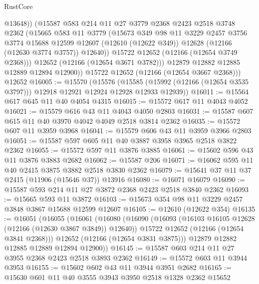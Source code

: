 \begin{lexlean}{RustCore}
\begin{coremodule}
                @13648))
            (@15587
              @583
              @214
              @11
              @27
              @3779
              @2368
              @2423
              @2518
              @3748
              @2362
              (@15665
                @583
                @11
                @3779
                (@15673
                  @349
                  @98
                  @11
                  @3229
                  @2457
                  @3756
                  @3774
                  @15688
                  @12599
                  @12607
                  (@12610 (@12622 @349))
                  @12628
                  (@12166 (@12630 @3774 @3757))
                  @12640))
              @15722
              @12652
              (@12166 (@12654 @3749 @2368)))
            @12652
            (@12166 (@12654 @3671 @3782)))
          @12879
          @12882
          @12885
          @12889
          @12894
          @12900))
      @15722
      @12652
      (@12166 (@12654 @3667 @2368)))
    @12652
@16005 := @15570
    (@15576
      (@15585 (@15992 (@12166 (@12654 @3535 @3797))) @12918 @12921 @12924 @12928 @12933 @12939))
@16011 := @15564 @617 @645 @11 @40 @4054 @4315
@16015 := @15572 @617 @11 @4043 @4052
@16021 := @15579 @616 @43 @11 @4043 @4050 @2803
@16031 := @15587 @607 @615 @11 @40 @3970 @4042 @4049 @2518 @3814 @2362
@16035 := @15572 @607 @11 @3959 @3968
@16041 := @15579 @606 @43 @11 @3959 @3966 @2803
@16051 := @15587 @597 @605 @11 @40 @3887 @3958 @3965 @2518 @3822 @2362
@16055 := @15572 @597 @11 @3876 @3885
@16061 := @15602 @596 @43 @11 @3876 @3883 @2682
@16062 := @15587 @206
@16071 := @16062 @595 @11 @40 @2415 @3875 @3882 @2518 @3830 @2362
@16079 := @15641 @37 @11 @37 @2415 (@11906 (@15646 @37)) @13916
@16080 := @16071 @16079
@16090 := @15587 @593 @214 @11 @27 @3872 @2368 @2423 @2518 @3840 @2362
@16093 := @15665 @593 @11 @3872
@16103 := @15673 @354 @98 @11 @3229 @2457 @3848 @3867 @15688 @12599 @12607
@16105 := @12610 (@12622 @354)
@16135 := @16051
    (@16055
      (@16061
        (@16080
          (@16090
            (@16093 (@16103 @16105 @12628 (@12166 (@12630 @3867 @3849)) @12640))
            @15722
            @12652
            (@12166 (@12654 @3841 @2368)))
          @12652
          (@12166 (@12654 @3831 @3875)))
        @12879
        @12882
        @12885
        @12889
        @12894
        @12900))
@16145 := @15587 @603 @214 @11 @27 @3955 @2368 @2423 @2518 @3893 @2362
@16149 := @15572 @603 @11 @3944 @3953
@16155 := @15602 @602 @43 @11 @3944 @3951 @2682
@16165 := @15630 @601 @11 @40 @3555 @3943 @3950 @2518 @1328 @2362 @15652

\end{coremodule}
\end{lexlean}
